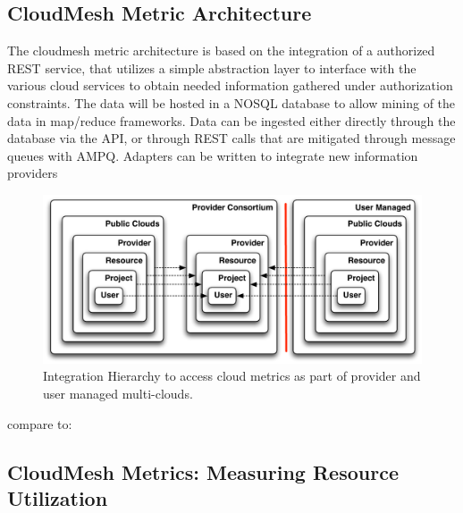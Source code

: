 \documentclass{tex/sig-alternate}
\begin{document}
{\subsection{CloudMesh Metric Architecture}

The cloudmesh metric architecture is based on the integration of a
authorized REST service, that utilizes a simple abstraction layer to interface
with the various cloud services to obtain needed information gathered
under authorization constraints. The data will be hosted in a NOSQL
database to allow mining of the data in map/reduce frameworks. Data
can be ingested either directly through the database via the API, or
through REST calls that are mitigated through message queues with
AMPQ. Adapters can be written to integrate new information providers 


\begin{figure}[htb]
  \centering
    \includegraphics[width=1.0\columnwidth]{images/metric-hierarchy.pdf}
  \caption{Integration Hierarchy to access cloud metrics as part of 
    provider and user managed multi-clouds.}
  \label{F:metric-arch}
\end{figure}


compare to: \cite{smith13info}

\subsection{CloudMesh Metrics: Measuring Resource Utilization}

 
}
\end{document}
